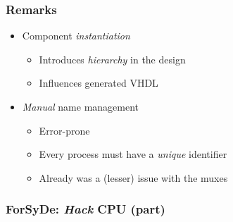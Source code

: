         \begin{frame}
            \frametitle{Remarks}

            \begin{itemize}
                \item Component \emph{instantiation}
                    \begin{itemize}
                        \item Introduces \emph{hierarchy} in the design
                        \item Influences generated VHDL
                    \end{itemize}
                \item \emph{Manual} name management
                    \begin{itemize}
                        \item Error-prone
                        \item Every process must have a \emph{unique} identifier
                        \item Already was a (lesser) issue with the muxes
                    \end{itemize}
            \end{itemize}
        \end{frame}

        \begin{frame}
            \frametitle{ForSyDe: \emph{Hack} CPU (part)}
        \end{frame}


